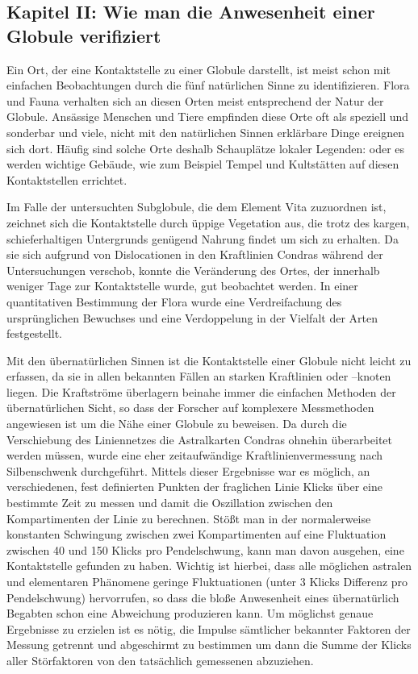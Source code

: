 \documentclass[a5paper,8pt]{book}
\begin{document}
\subsection{Kapitel II: Wie man die Anwesenheit einer Globule verifiziert}

Ein Ort, der eine Kontaktstelle zu einer Globule darstellt, ist meist schon mit einfachen Beobachtungen durch die fünf 
natürlichen Sinne zu identifizieren. Flora und Fauna verhalten sich an diesen Orten meist entsprechend der Natur der 
Globule. Ansässige Menschen und Tiere empfinden diese Orte oft als speziell und sonderbar und viele, nicht mit den 
natürlichen Sinnen erklärbare Dinge ereignen sich dort. Häufig sind solche Orte deshalb Schauplätze lokaler Legenden: 
oder es werden wichtige Gebäude, wie zum Beispiel Tempel und Kultstätten auf diesen Kontaktstellen errichtet. 

Im Falle der untersuchten Subglobule, die dem Element Vita zuzuordnen ist, zeichnet sich die Kontaktstelle durch üppige 
Vegetation aus, die trotz des kargen, schieferhaltigen Untergrunds genügend Nahrung findet um sich zu erhalten. Da sie 
sich aufgrund von Dislocationen in den Kraftlinien Condras während der Untersuchungen verschob, konnte die Veränderung 
des Ortes, der innerhalb weniger Tage zur Kontaktstelle wurde, gut beobachtet werden. In einer quantitativen Bestimmung 
der Flora wurde eine Verdreifachung des ursprünglichen Bewuchses und eine Verdoppelung in der Vielfalt der Arten 
festgestellt.

Mit den übernatürlichen Sinnen ist die Kontaktstelle einer Globule nicht leicht zu erfassen, da sie in allen bekannten 
Fällen an starken Kraftlinien oder –knoten liegen. Die Kraftströme überlagern beinahe immer die einfachen Methoden der 
übernatürlichen Sicht, so dass der Forscher auf komplexere Messmethoden angewiesen ist um die Nähe einer Globule zu 
beweisen. Da durch die Verschiebung des Liniennetzes die Astralkarten Condras ohnehin überarbeitet werden müssen, wurde 
eine eher zeitaufwändige Kraftlinienvermessung nach Silbenschwenk durchgeführt. Mittels dieser Ergebnisse war es möglich, 
an verschiedenen, fest definierten Punkten der fraglichen Linie Klicks über eine bestimmte Zeit zu messen und damit die 
Oszillation zwischen den Kompartimenten der Linie zu berechnen.
Stößt man in der normalerweise konstanten Schwingung zwischen zwei Kompartimenten auf eine Fluktuation zwischen 40 und 
150 Klicks pro Pendelschwung, kann man davon ausgehen, eine Kontaktstelle gefunden zu haben. Wichtig ist hierbei, dass 
alle möglichen astralen und elementaren Phänomene geringe Fluktuationen (unter 3 Klicks Differenz pro Pendelschwung) 
hervorrufen, so dass die bloße Anwesenheit eines übernatürlich Begabten schon eine Abweichung produzieren kann. Um 
möglichst genaue Ergebnisse zu erzielen ist es nötig, die Impulse sämtlicher bekannter Faktoren der Messung getrennt und 
abgeschirmt zu bestimmen um dann die Summe der Klicks aller Störfaktoren von den tatsächlich gemessenen abzuziehen. 
\end{document}
